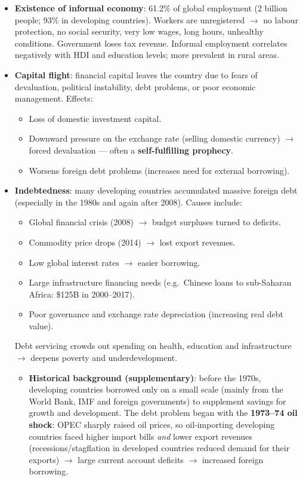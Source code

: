 \documentclass[a4paper,12pt]{article}
\begin{document}
\begin{itemize}
\begin{itemize}
    \item \textbf{Non-tariff barriers} (``new trade protection''): health/safety standards, administrative barriers, environmental standards --- sometimes used as hidden protection against developing-country exports.
  \end{itemize}
  \item \textbf{Existence of informal economy}: 61.2\% of global employment (2 billion people; 93\% in developing countries). Workers are unregistered $\to$ no labour protection, no social security, very low wages, long hours, unhealthy conditions. Government loses tax revenue. Informal employment correlates negatively with HDI and education levels; more prevalent in rural areas.
  \item \textbf{Capital flight}: financial capital leaves the country due to fears of devaluation, political instability, debt problems, or poor economic management. Effects:
  \begin{itemize}
    \item Loss of domestic investment capital.
    \item Downward pressure on the exchange rate (selling domestic currency) $\to$ forced devaluation --- often a \textbf{self-fulfilling prophecy}.
    \item Worsens foreign debt problems (increases need for external borrowing).
  \end{itemize}
  \item \textbf{Indebtedness}: many developing countries accumulated massive foreign debt (especially in the 1980s and again after 2008). Causes include:
  \begin{itemize}
    \item Global financial crisis (2008) $\to$ budget surpluses turned to deficits.
    \item Commodity price drops (2014) $\to$ lost export revenues.
    \item Low global interest rates $\to$ easier borrowing.
    \item Large infrastructure financing needs (e.g.\ Chinese loans to sub-Saharan Africa: \$125B in 2000--2017).
    \item Poor governance and exchange rate depreciation (increasing real debt value).
  \end{itemize}
  Debt servicing crowds out spending on health, education and infrastructure $\to$ deepens poverty and underdevelopment.
  \begin{itemize}
    \item \textbf{Historical background (supplementary)}: before the 1970s, developing countries borrowed only on a small scale (mainly from the World Bank, IMF and foreign governments) to supplement savings for growth and development. The debt problem began with the \textbf{1973--74 oil shock}: OPEC sharply raised oil prices, so oil-importing developing countries faced higher import bills \textit{and} lower export revenues (recessions/stagflation in developed countries reduced demand for their exports) $\to$ large current account deficits $\to$ increased foreign borrowing.

\end{itemize}
\end{itemize}
\end{document}
